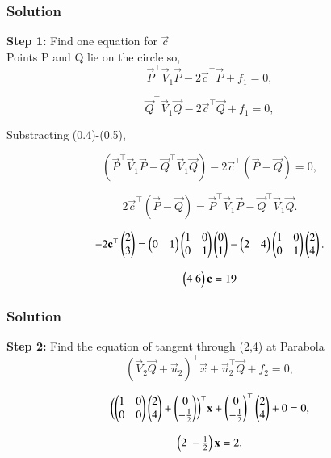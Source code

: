 \documentclass{beamer}
\numberwithin{equation}{section}
\begin{document}
\begin{frame}[fragile]
    \frametitle{Solution}
\textbf{Step 1:} Find one equation for $\vec{c}$\\
Points P and Q lie on the circle so,
\begin{equation}
\vec{P}^\top \vec{V}_1 \vec{P} - 2 \vec{c}^\top \vec{P} + f_1 = 0,
\end{equation}

\begin{equation}
\vec{Q}^\top \vec{V}_1 \vec{Q} - 2 \vec{c}^\top \vec{Q} + f_1 = 0,
\end{equation}

Substracting (0.4)-(0.5),

\begin{equation}
(\vec{P}^\top \vec{V}_1 \vec{P} - \vec{Q}^\top \vec{V}_1 \vec{Q}) 
- 2 \vec{c}^\top (\vec{P} - \vec{Q}) = 0,
\end{equation}

\begin{equation}
2 \vec{c}^\top (\vec{P} - \vec{Q}) = \vec{P}^\top \vec{V}_1 \vec{P} - \vec{Q}^\top \vec{V}_1 \vec{Q}.
\end{equation}

\begin{equation}
-2 \mathbf{c}^\top \begin{pmatrix}2 \\ 3\end{pmatrix} = 
\begin{pmatrix}0 & 1\end{pmatrix} 
\begin{pmatrix}1 & 0 \\ 0 & 1\end{pmatrix} 
\begin{pmatrix}0 \\ 1\end{pmatrix} - 
\begin{pmatrix}2 & 4\end{pmatrix} 
\begin{pmatrix}1 & 0 \\ 0 & 1\end{pmatrix} 
\begin{pmatrix}2 \\ 4\end{pmatrix}.
\end{equation}

\begin{equation}
\begin{pmatrix}4 \ 6\end{pmatrix}\mathbf{c} = 19
\end{equation} 
\end{frame}


\begin{frame}[fragile]
    \frametitle{Solution}

\textbf{Step 2:} Find the equation of tangent through (2,4) at Parabola
\begin{equation}
(\vec{V}_2 \vec{Q} + \vec{u}_2)^\top \vec{x} + \vec{u}_2^\top \vec{Q} + f_2 = 0,
\end{equation}

\begin{equation}
\biggl(
\begin{pmatrix}1 & 0 \\ 0 & 0\end{pmatrix}
\begin{pmatrix}2 \\ 4\end{pmatrix}
+
\begin{pmatrix}0 \\ -\tfrac{1}{2}\end{pmatrix}
\biggr)^\top \mathbf{x}
+
\begin{pmatrix}0 \\ -\tfrac{1}{2}\end{pmatrix}^\top
\begin{pmatrix}2 \\ 4\end{pmatrix}
+ 0 = 0,
\end{equation}

\begin{equation}
\begin{pmatrix}2 \ -\tfrac{1}{2}\end{pmatrix} \mathbf{x} = 2.
\end{equation}

\end{frame}
\end{document}
